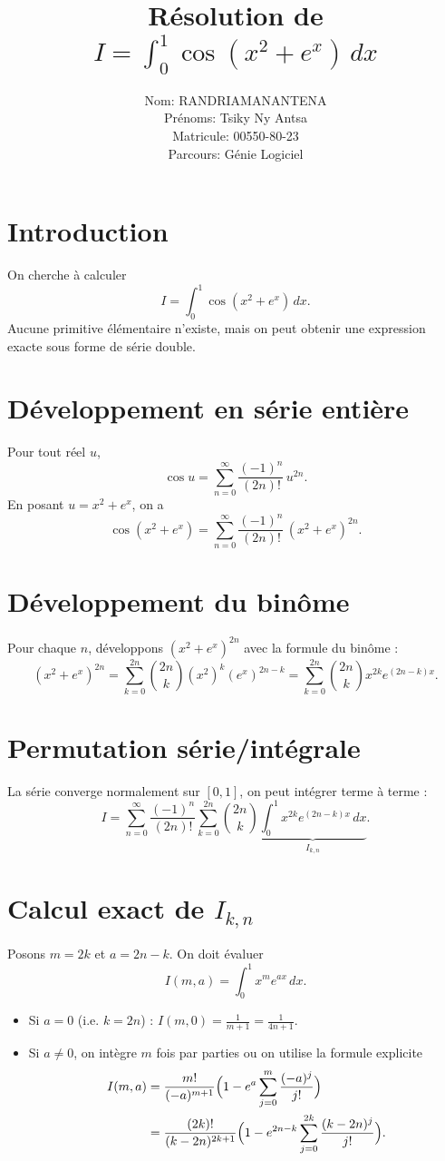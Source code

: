 \documentclass[a4paper,12pt]{article}
\title{Résolution de \(\displaystyle I = \int_0^1 \cos(x^2+e^x)\,dx\)}
\author{Nom: RANDRIAMANANTENA \\
Prénoms: Tsiky Ny Antsa \\
Matricule: 00550-80-23 \\
Parcours: Génie Logiciel}
\date{}
\begin{document}
\maketitle

\section{Introduction}
On cherche à calculer 
\[
I = \int_0^1 \cos(x^2 + e^x)\,dx .
\]
Aucune primitive élémentaire n’existe, mais on peut obtenir une expression exacte sous forme de série double.

\section{Développement en série entière}
Pour tout réel $u$,
\[
\cos u = \sum_{n=0}^{\infty} \frac{(-1)^n}{(2n)!}\, u^{2n}.
\]
En posant $u = x^2 + e^x$, on a
\[
\cos(x^2+e^x) = \sum_{n=0}^{\infty} \frac{(-1)^n}{(2n)!}\, (x^2+e^x)^{2n}.
\]

\section{Développement du binôme}
Pour chaque $n$, développons $(x^2+e^x)^{2n}$ avec la formule du binôme :
\[
(x^2+e^x)^{2n} = \sum_{k=0}^{2n} \binom{2n}{k} (x^2)^k (e^x)^{2n-k}
= \sum_{k=0}^{2n} \binom{2n}{k} x^{2k} e^{(2n-k)x}.
\]

\section{Permutation série/intégrale}
La série converge normalement sur $[0,1]$, on peut intégrer terme à terme :
\[
I = \sum_{n=0}^{\infty} \frac{(-1)^n}{(2n)!}
\sum_{k=0}^{2n} \binom{2n}{k}
\underbrace{\int_0^1 x^{2k} e^{(2n-k)x}\,dx}_{I_{k,n}} .
\]

\section{Calcul exact de \(I_{k,n}\)}
Posons $m = 2k$ et $a = 2n-k$. On doit évaluer
\[
I(m,a) = \int_0^1 x^{m} e^{a x}\,dx .
\]
\begin{itemize}
\item Si $a = 0$ (i.e. $k=2n$) : $\displaystyle I(m,0) = \frac{1}{m+1} = \frac{1}{4n+1}$.
\item Si $a \neq 0$, on intègre $m$ fois par parties ou on utilise la formule explicite
\begin{align*}
I(m,a) &= \frac{m!}{(-a)^{m+1}}\Bigl(1 - e^{a}\sum_{j=0}^{m}\frac{(-a)^j}{j!}\Bigr) \\
&= \frac{(2k)!}{(k-2n)^{2k+1}}\Bigl(1 - e^{2n-k}\sum_{j=0}^{2k}\frac{(k-2n)^j}{j!}\Bigr).
\end{align*}
\end{itemize}
\end{document}
